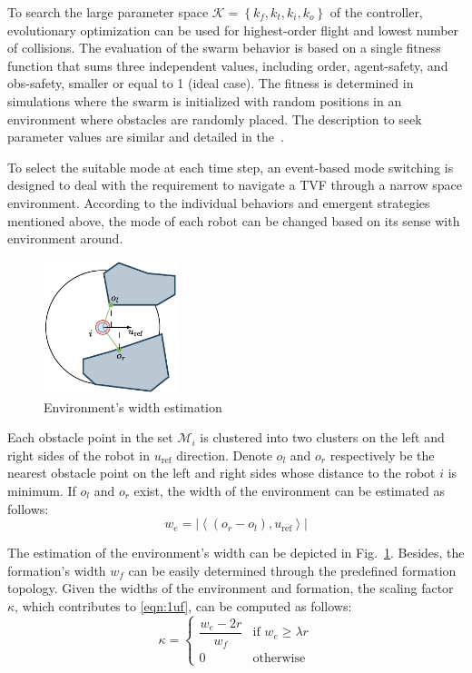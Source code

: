 To search the large parameter space $\mathcal{K}=\left\{k_f,k_t,k_i,k_o\right\}$ of the controller, evolutionary optimization can be used for highest-order flight and lowest number of collisions. The evaluation of the swarm behavior is based on a single fitness function that sums three independent values, including order, agent-safety, and obs-safety, smaller or equal to 1 (ideal case). The fitness is determined in simulations where the swarm is initialized with random positions in an environment where obstacles are  randomly placed. The description  to seek parameter values are similar and detailed in the~\cite{Vsrhelyi2018}.

To select the suitable mode at each time step, an event-based mode switching is designed to deal with the requirement to navigate a TVF through a narrow space environment. According to the individual behaviors and emergent strategies mentioned above, the mode of each robot can be changed based on its sense with environment around.

\begin{figure}
    \centering
    \includegraphics[width=0.35\textwidth]{paper2/images/we.pdf}
    \caption{Environment's width estimation}
    \label{fig:1we}
\end{figure}

Each obstacle point in the set $\mathcal{M}_{i}$ is clustered into two clusters on the left and right sides of the robot in $u_\text{ref}$ direction. Denote $o_l$ and $o_r$ respectively be the nearest obstacle point on the left and right sides whose distance to the robot $i$ is minimum. If $o_l$ and $o_r$ exist, the width of the environment can be estimated as follows:
\begin{equation}
    w_e= \left\vert\left\langle\left(o_r-o_l\right),u_\text{ref}\right\rangle\right\vert
    \label{eqn:1we}
\end{equation}

The estimation of the environment's width can be depicted in Fig.~\ref{fig:1we}. Besides, the formation's width $w_f$ can be easily determined through the predefined formation topology. Given the widths of the environment and formation, the scaling factor $\kappa$, which contributes to \eqref{eqn:1uf}, can be computed as follows:
\begin{equation}
    \kappa = 
    \begin{cases} 
        \dfrac{w_e - 2r}{w_f} & \text{if } w_e \geq \lambda r \\
        0 & \text{otherwise}
    \end{cases}
    \label{eqn:1kappa}
\end{equation}

